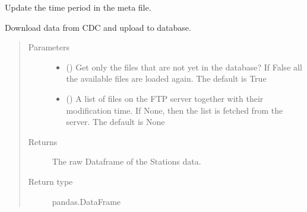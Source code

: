\documentclass[letterpaper,10pt,english]{sphinxmanual}
\begin{document}
\begin{fulllineitems}
\begin{fulllineitems}
\label{\detokenize{weatherDB:weatherDB.station.StationBase.update_period_meta}}
\sphinxAtStartPar
Update the time period in the meta file.

\end{fulllineitems}


\begin{fulllineitems}
\label{\detokenize{weatherDB:weatherDB.station.StationBase.update_raw}}
\sphinxAtStartPar
Download data from CDC and upload to database.
\begin{quote}\begin{description}
\item[{Parameters}] \leavevmode\begin{itemize}
\item {} 
\sphinxAtStartPar
{} (\sphinxstyleliteralemphasis{\sphinxupquote{, }}) \textendash{} Get only the files that are not yet in the database?
If False all the available files are loaded again.
The default is True

\item {} 
\sphinxAtStartPar
{} (\sphinxstyleliteralemphasis{\sphinxupquote{ (}}\sphinxstyleliteralemphasis{\sphinxupquote{, }}\sphinxstyleliteralemphasis{\sphinxupquote{)}}\sphinxstyleliteralemphasis{\sphinxupquote{, }}) \textendash{} A list of files on the FTP server together with their modification time.
If None, then the list is fetched from the server.
The default is None

\end{itemize}

\item[{Returns}] \leavevmode
\sphinxAtStartPar
The raw Dataframe of the Stations data.

\item[{Return type}] \leavevmode
\sphinxAtStartPar
pandas.DataFrame

\end{description}\end{quote}

\end{fulllineitems}


\end{fulllineitems}
\end{document}
